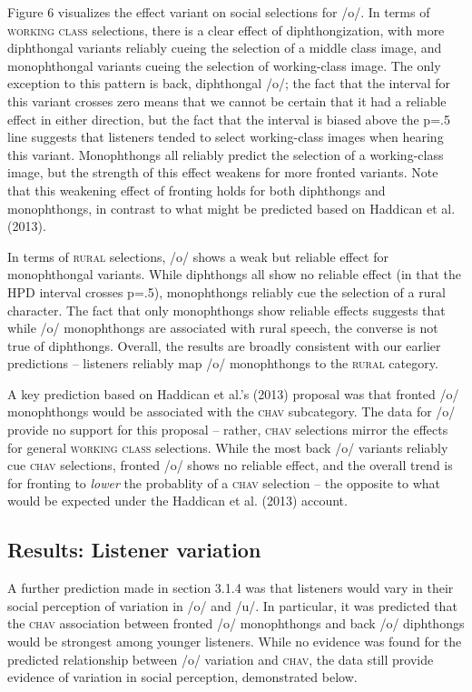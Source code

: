 \documentclass[PWPL]{article}
\begin{document}
Figure 6 visualizes the effect variant on social selections for /o/. In terms of \textsc{working class} selections, there is a clear effect of diphthongization, with more diphthongal variants reliably cueing the selection of a middle class image, and monophthongal variants cueing the selection of working-class image. The only exception to this pattern is back, diphthongal /o/; the fact that the interval for this variant crosses zero means that we cannot be certain that it had a reliable effect in either direction, but the fact that the interval is biased above the p=.5 line suggests that listeners tended to select working-class images when hearing this variant. Monophthongs all reliably predict the selection of a working-class image, but the strength of this effect weakens for more fronted variants. Note that this weakening effect of fronting holds for both diphthongs and monophthongs, in contrast to what might be predicted based on Haddican et al. (2013). 

In terms of \textsc{rural} selections, /o/ shows a weak but reliable effect for monophthongal variants. While diphthongs all show no reliable effect (in that the HPD interval crosses p=.5), monophthongs reliably cue the selection of a rural character. The fact that only monophthongs show reliable effects suggests that while /o/ monophthongs are associated with rural speech, the converse is not true of diphthongs. Overall, the results are broadly consistent with our earlier predictions -- listeners reliably map /o/ monophthongs to the \textsc{rural} category.

A key prediction based on Haddican et al.'s (2013) proposal was that fronted /o/ monophthongs would be associated with the \textsc{chav} subcategory. The data for /o/ provide no support for this proposal -- rather, \textsc{chav} selections mirror the effects for general  \textsc{working class} selections. While the most back /o/ variants reliably cue \textsc{chav} selections, fronted /o/ shows no reliable effect, and the overall trend is for fronting to \textit{lower} the probablity of a \textsc{chav} selection -- the opposite to what would be expected under the Haddican et al. (2013) account.



\subsection{Results: Listener variation}
A further prediction made in section 3.1.4 was that listeners would vary in their social perception of variation in /o/ and /u/. In particular, it was predicted that the \textsc{chav} association between fronted /o/ monophthongs and back /o/ diphthongs would be strongest among younger listeners. While no evidence was found for the predicted relationship between /o/ variation and \textsc{chav}, the data still provide evidence of variation in social perception, demonstrated below.
\end{document}
